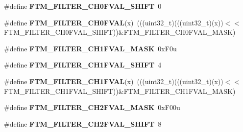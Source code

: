 \begin{DoxyCompactItemize}
\item 
\#define {\bfseries F\+T\+M\+\_\+\+F\+I\+L\+T\+E\+R\+\_\+\+C\+H0\+F\+V\+A\+L\+\_\+\+S\+H\+I\+FT}~0\hypertarget{group__FTM__Register__Masks_ga35f6890f59003ec058dbcc151ebc399c}{}\label{group__FTM__Register__Masks_ga35f6890f59003ec058dbcc151ebc399c}

\item 
\#define {\bfseries F\+T\+M\+\_\+\+F\+I\+L\+T\+E\+R\+\_\+\+C\+H0\+F\+V\+AL}(x)~(((uint32\+\_\+t)(((uint32\+\_\+t)(x))$<$$<$F\+T\+M\+\_\+\+F\+I\+L\+T\+E\+R\+\_\+\+C\+H0\+F\+V\+A\+L\+\_\+\+S\+H\+I\+FT))\&F\+T\+M\+\_\+\+F\+I\+L\+T\+E\+R\+\_\+\+C\+H0\+F\+V\+A\+L\+\_\+\+M\+A\+SK)\hypertarget{group__FTM__Register__Masks_ga8ca64d4437bf63561c5222244e8a696a}{}\label{group__FTM__Register__Masks_ga8ca64d4437bf63561c5222244e8a696a}

\item 
\#define {\bfseries F\+T\+M\+\_\+\+F\+I\+L\+T\+E\+R\+\_\+\+C\+H1\+F\+V\+A\+L\+\_\+\+M\+A\+SK}~0x\+F0u\hypertarget{group__FTM__Register__Masks_gae3c17178123eda4dedc1b20f4c6d331e}{}\label{group__FTM__Register__Masks_gae3c17178123eda4dedc1b20f4c6d331e}

\item 
\#define {\bfseries F\+T\+M\+\_\+\+F\+I\+L\+T\+E\+R\+\_\+\+C\+H1\+F\+V\+A\+L\+\_\+\+S\+H\+I\+FT}~4\hypertarget{group__FTM__Register__Masks_gaed23e149091b6f6982050e2de4385584}{}\label{group__FTM__Register__Masks_gaed23e149091b6f6982050e2de4385584}

\item 
\#define {\bfseries F\+T\+M\+\_\+\+F\+I\+L\+T\+E\+R\+\_\+\+C\+H1\+F\+V\+AL}(x)~(((uint32\+\_\+t)(((uint32\+\_\+t)(x))$<$$<$F\+T\+M\+\_\+\+F\+I\+L\+T\+E\+R\+\_\+\+C\+H1\+F\+V\+A\+L\+\_\+\+S\+H\+I\+FT))\&F\+T\+M\+\_\+\+F\+I\+L\+T\+E\+R\+\_\+\+C\+H1\+F\+V\+A\+L\+\_\+\+M\+A\+SK)\hypertarget{group__FTM__Register__Masks_ga3face5c96a8f83237f9e95786fc4a014}{}\label{group__FTM__Register__Masks_ga3face5c96a8f83237f9e95786fc4a014}

\item 
\#define {\bfseries F\+T\+M\+\_\+\+F\+I\+L\+T\+E\+R\+\_\+\+C\+H2\+F\+V\+A\+L\+\_\+\+M\+A\+SK}~0x\+F00u\hypertarget{group__FTM__Register__Masks_ga33bec78729047fa99f4534d68d36f696}{}\label{group__FTM__Register__Masks_ga33bec78729047fa99f4534d68d36f696}

\item 
\#define {\bfseries F\+T\+M\+\_\+\+F\+I\+L\+T\+E\+R\+\_\+\+C\+H2\+F\+V\+A\+L\+\_\+\+S\+H\+I\+FT}~8\hypertarget{group__FTM__Register__Masks_ga9d2eef1684a2f4dbb28931408cf3248f}{}\label{group__FTM__Register__Masks_ga9d2eef1684a2f4dbb28931408cf3248f}


\end{DoxyCompactItemize}
